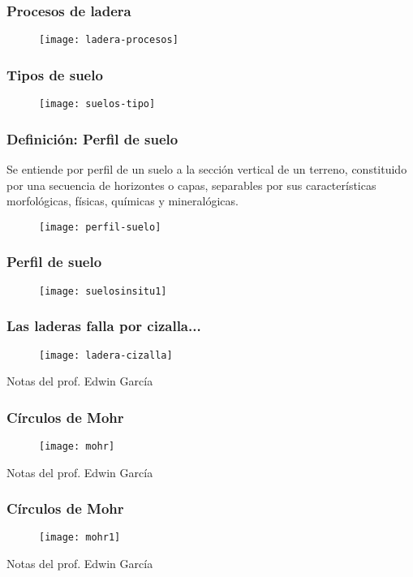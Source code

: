 \documentclass[12pt]{beamer}
\begin{document}
\begin{frame}
\frametitle{Procesos de ladera}
\begin{figure}
\centering
\texttt{[image: ladera-procesos]}
\end{figure}
\end{frame}
\begin{frame}
\frametitle{Tipos de suelo}
\begin{figure}
\centering
\texttt{[image: suelos-tipo]}
\end{figure}
\end{frame}
\begin{frame}
\frametitle{Definición: Perfil de suelo}
\scriptsize{Se entiende por perfil de un suelo a la sección vertical de un terreno, constituido por una secuencia de horizontes o capas, separables por sus características morfológicas, físicas, químicas y mineralógicas. }
\begin{figure}
\centering
\texttt{[image: perfil-suelo]}
\end{figure}
\end{frame}
\begin{frame}
\frametitle{Perfil de suelo}
\begin{figure}
\centering
\texttt{[image: suelosinsitu1]}
\end{figure}
\end{frame}
\begin{frame}
\frametitle{Las laderas falla por cizalla...}
\begin{figure}
\centering
\texttt{[image: ladera-cizalla]}
\end{figure}
\tiny{Notas del prof. Edwin García}
\end{frame}
\begin{frame}
\frametitle{Círculos de Mohr}
\begin{figure}
\centering
\texttt{[image: mohr]}
\end{figure}
\tiny{Notas del prof. Edwin García}
\end{frame}
\begin{frame}
\frametitle{Círculos de Mohr}
\begin{figure}
\centering
\texttt{[image: mohr1]}
\end{figure}
\tiny{Notas del prof. Edwin García}
\end{frame}
\end{document}
